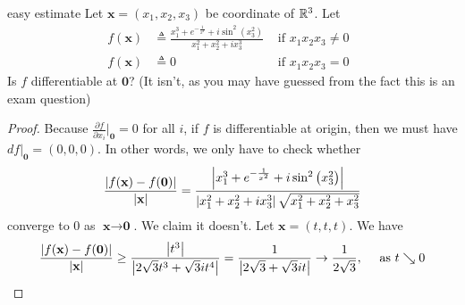 \documentclass{report}
\begin{document}
\begin{question}{easy estimate}{}
Let $\textbf{x}=(x_1,x_2,x_3)$ be coordinate of $\mathbb{R}^3$. Let 
\begin{align*}
  f(\textbf{x})&\triangleq  \frac{x_1^3+e^{-\frac{1}{x^2}}+i \sin^2 \left( x_3^2 \right)}{x_1^2+x_2^2+i x_3^3 } &\text{ if $x_1x_2x_3\neq 0$ }\\
  f(\textbf{x})&\triangleq  0  &\text{ if }x_1x_2x_3=0
\end{align*}
Is $f$ differentiable at $\textbf{0}$? (It isn't, as you may have guessed from the fact this is an exam question) 
\end{question}
\begin{proof}
Because $\frac{\partial f}{\partial x_i}\big|_{\textbf{0}}=0$ for all $i$, if $f$ is differentiable at origin, then we must have $df|_\textbf{0}= (0,0,0)$. In other words, we only have to check whether
\begin{align*}
   \frac{\left|f(\textbf{x})- f(\textbf{0})\right|}{\left|\textbf{x}\right|}=\frac{\left|x_1^3 + e^{-\frac{1}{x^2}}+ i \sin^2 \left(x_3^2 \right)\right|}{\left|x_1^2+x_2^2+i x_3^3 \right| \sqrt{x_1^2+x_2^2+x_3^2} }
\end{align*}
converge to $0$ as  $\textbf{x}\rightarrow \textbf{0}$. We claim it doesn't. Let $\textbf{x}=(t,t,t)$. We have 
\begin{align*}
  \frac{\left|f(\textbf{x})- f(\textbf{0})\right|}{\left|\textbf{x}\right|}\geq  \frac{\left|t^3\right|}{ \left|2\sqrt{3}t^3+\sqrt{3} it^4\right| } = \frac{1}{\left|2\sqrt{3} + \sqrt{3}it\right|} \rightarrow \frac{1}{2\sqrt{3}},\quad \text{ as }t \searrow 0
\end{align*}
\end{proof}
\end{document}
